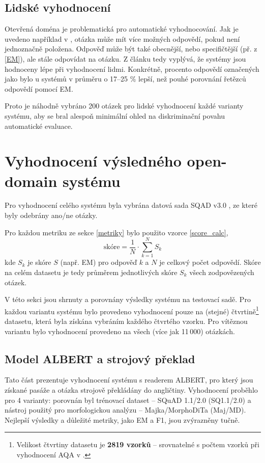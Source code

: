 \subsection{Lidské vyhodnocení}
Otevřená doména je problematická pro automatické vyhodnocování. Jak je uvedeno například v \cite{min2021neurips}, otázka může mít více možných odpovědí, pokud není jednoznačně položena. Odpověď může být také obecnější, nebo specifičtější (př. z \ref{EM}), ale stále odpovídat na otázku. Z článku \cite{min2021neurips} tedy vyplývá, že systémy jsou hodnoceny lépe při vyhodnocení lidmi. Konkrétně, procento odpovědí označených jako  bylo u systémů v průměru o 17--25 \% lepší, než pouhé porovnání řetězců odpovědí pomocí EM.\par
Proto je náhodně vybráno 200 otázek pro lidské vyhodnocení každé varianty systému, aby se bral alespoň minimální ohled na diskriminační povahu automatické evaluace.

\section{Vyhodnocení výsledného open-domain systému}
Pro vyhodnocení celého systému byla vybrána datová sada SQAD v3.0 \cite{sqad}, ze které byly odebrány ano/ne otázky.\par
Pro každou metriku ze sekce \ref{metriky} bylo použito vzorce \ref{score_calc},
\begin{equation}
    \label{score_calc}
    \text{skóre} = \frac{1}{N}\cdot \sum^N_{k=1} S_k
\end{equation}
kde $S_k$ je skóre $S$ (např. EM) pro odpověď $k$ a $N$ je celkový počet odpovědí. Skóre na celém datasetu je tedy průměrem jednotlivých skóre $S_k$ všech zodpovězených otázek.\par
V této sekci jsou shrnuty a porovnány výsledky systému na testovací sadě. Pro každou variantu systému bylo provedeno vyhodnocení pouze na (stejné) čtvrtině\footnote{Velikost čtvrtiny datasetu je \textbf{2819 vzorků} -- srovnatelné s počtem vzorků při vyhodnocení AQA v \cite{aqa2018}.} datasetu, která byla získána vybráním každého čtvrtého vzorku. Pro vítěznou variantu bylo vyhodnocení provedeno na všech (více jak 11\,000) otázkách.

\subsection{Model ALBERT a strojový překlad}
\label{albert_eval}
Tato část prezentuje vyhodnocení systému s readerem ALBERT, pro který jsou získané pasáže a otázka strojově překládány do angličtiny. Vyhodnocení proběhlo pro 4 varianty: porovnán byl trénovací dataset -- SQuAD 1.1/2.0 (SQ1.1/2.0) a nástroj použitý pro morfologickou analýzu -- Majka/MorphoDiTa (Maj/MD). Nejlepší výsledky a důležité metriky, jako EM a F1, jsou zvýrazněny tučně.

